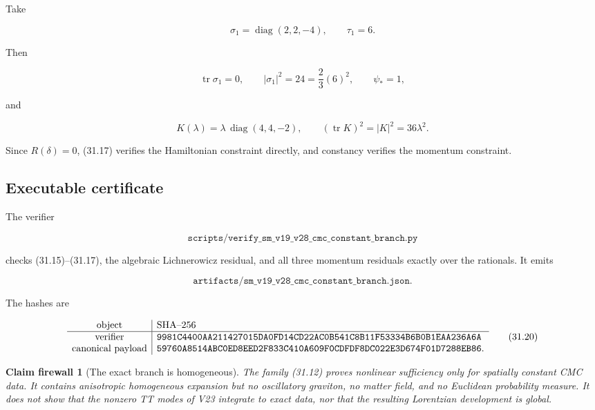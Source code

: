 \documentclass[11pt]{article}
\newtheorem{firewall}[theorem]{Claim firewall}
\theoremstyle{remark}
\begin{document}
Take

\[
 \sigma_1=\operatorname{diag}(2,2,-4),\qquad \tau_1=6.         \tag{31.15}
\]

Then

\[
 \operatorname{tr}\sigma_1=0,\qquad
 |\sigma_1|^2=24=\frac23(6)^2,\qquad \psi_*=1,                \tag{31.16}
\]

and

\[
 K(\lambda)=\lambda\,\operatorname{diag}(4,4,-2),\qquad
 (\operatorname{tr}K)^2=|K|^2=36\lambda^2.                   \tag{31.17}
\]

Since \(R(\delta)=0\), (31.17) verifies the Hamiltonian constraint
directly, and constancy verifies the momentum constraint.

\subsection{Executable certificate}

The verifier

\[
 \texttt{scripts/verify\_sm\_v19\_v28\_cmc\_constant\_branch.py}
                                                                    \tag{31.18}
\]

checks (31.15)--(31.17), the algebraic Lichnerowicz residual, and all
three momentum residuals exactly over the rationals.  It emits

\[
 \texttt{artifacts/sm\_v19\_v28\_cmc\_constant\_branch.json}.  \tag{31.19}
\]

The hashes are

\[
\begin{array}{c|l}
\hbox{object}&\hbox{SHA--256}\\ \hline
\hbox{verifier}&
\texttt{9981C4400AA211427015DA0FD14CD22AC0B541C8B11F53334B6B0B1EAA236A6A}\\
\hbox{canonical payload}&
\texttt{59760A8514ABC0ED8EED2F833C410A609F0CDFDF8DC022E3D674F01D7288EB86}.
\end{array}                                                     \tag{31.20}
\]

\begin{firewall}[The exact branch is homogeneous]
\label{fire:v19v28}
The family (31.12) proves nonlinear sufficiency only for spatially
constant CMC data.  It contains anisotropic homogeneous expansion but no
oscillatory graviton, no matter field, and no Euclidean probability
measure.  It does not show that the nonzero TT modes of V23 integrate to
exact data, nor that the resulting Lorentzian development is global.
\end{firewall}
\end{document}
